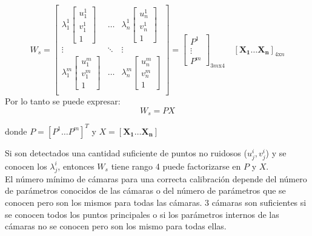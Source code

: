 \[
W_s =
\begin{bmatrix}

	\lambda_1^1
	\begin{bmatrix}
	u_1^1 \\
	v_1^1 \\
	1
	\end{bmatrix} &
	
	\ldots &
	
	\lambda_n^1
	\begin{bmatrix}
	u_n^1 \\
	v_n^1 \\
	1
	\end{bmatrix} \\
	
	\vdots & \ddots & \vdots \\
	
	
	\lambda_1^m
	\begin{bmatrix}
	u_1^m \\
	v_1^m \\
	1
	\end{bmatrix} &
	
	\ldots &
	
	\lambda_n^m
	\begin{bmatrix}
	u_n^m \\
	v_n^m \\
	1
	\end{bmatrix} \\

\end{bmatrix}
= 
\begin{bmatrix}
P^1 \\
\vdots \\
P^m
\end{bmatrix}_{3m\text{x}4}
\quad
[\mathbf{X_1} \ldots \mathbf{X_n}]_{4\text{x}n}
\]
Por lo tanto se puede expresar:
\[ W_s = PX\]

donde $P = [P^1 \ldots P^m]^T$ y $X = [\mathbf{X_1} \ldots \mathbf{X_n}]$

Si son detectados una cantidad suficiente de puntos no ruidosos ($u_j^i, v_j^i$) y se conocen los $\lambda_j^i$, entonces $W_s$ tiene rango 4 puede factorizarse en $P$ y $X$.\\

El número mínimo de cámaras para una correcta calibración depende del número de parámetros conocidos de las cámaras o del número de parámetros que se conocen pero son los mismos para todas las cámaras. 3 cámaras son suficientes si se conocen todos los puntos principales o si los parámetros internos de las cámaras no se conocen pero son los mismo para todas ellas.\\

